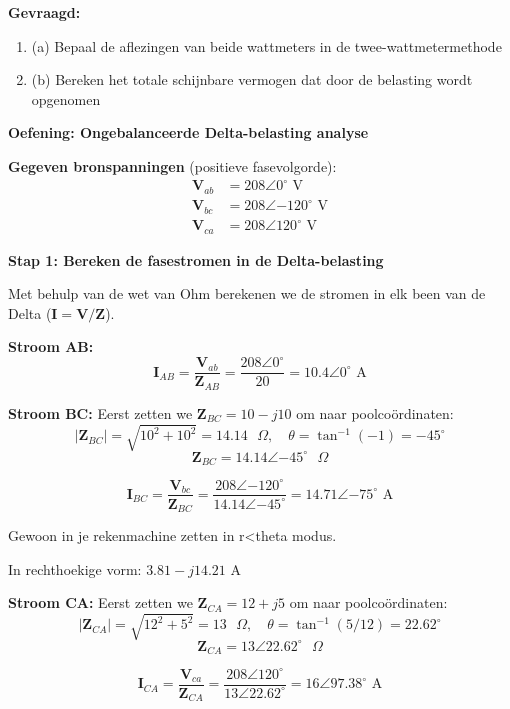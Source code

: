 \documentclass[a4paper,11pt]{article}
\begin{document}
\textbf{Gevraagd:}
\begin{enumerate}
    \item (a) Bepaal de aflezingen van beide wattmeters in de twee-wattmetermethode
    \item (b) Bereken het totale schijnbare vermogen dat door de belasting wordt opgenomen
\end{enumerate}

\begin{oefenblok}

\textbf{Oefening: Ongebalanceerde Delta-belasting analyse}

\textbf{Gegeven bronspanningen} (positieve fasevolgorde):
\begin{align*}
\mathbf{V}_{ab} &= 208\angle{0^\circ} \text{ V} \\
\mathbf{V}_{bc} &= 208\angle{-120^\circ} \text{ V} \\
\mathbf{V}_{ca} &= 208\angle{120^\circ} \text{ V}
\end{align*}

\textbf{Stap 1: Bereken de fasestromen in de Delta-belasting}

Met behulp van de wet van Ohm berekenen we de stromen in elk been van de Delta ($\mathbf{I} = \mathbf{V}/\mathbf{Z}$).

\textbf{Stroom AB:}
$$\mathbf{I}_{AB} = \frac{\mathbf{V}_{ab}}{\mathbf{Z}_{AB}} = \frac{208\angle{0^\circ}}{20} = 10.4\angle{0^\circ} \text{ A}$$

\textbf{Stroom BC:}
Eerst zetten we $\mathbf{Z}_{BC} = 10 - j10$ om naar poolcoördinaten:
$$|\mathbf{Z}_{BC}| = \sqrt{10^2 + 10^2} = 14.14 \text{ } \Omega, \quad \theta = \tan^{-1}(-1) = -45^\circ$$
$$\mathbf{Z}_{BC} = 14.14\angle{-45^\circ} \text{ } \Omega$$

$$\mathbf{I}_{BC} = \frac{\mathbf{V}_{bc}}{\mathbf{Z}_{BC}} = \frac{208\angle{-120^\circ}}{14.14\angle{-45^\circ}} = 14.71\angle{-75^\circ} \text{ A}$$

Gewoon in je rekenmachine zetten in r<theta modus.

In rechthoekige vorm: $3.81 - j14.21 \text{ A}$

\textbf{Stroom CA:}
Eerst zetten we $\mathbf{Z}_{CA} = 12 + j5$ om naar poolcoördinaten:
$$|\mathbf{Z}_{CA}| = \sqrt{12^2 + 5^2} = 13 \text{ } \Omega, \quad \theta = \tan^{-1}(5/12) = 22.62^\circ$$
$$\mathbf{Z}_{CA} = 13\angle{22.62^\circ} \text{ } \Omega$$

$$\mathbf{I}_{CA} = \frac{\mathbf{V}_{ca}}{\mathbf{Z}_{CA}} = \frac{208\angle{120^\circ}}{13\angle{22.62^\circ}} = 16\angle{97.38^\circ} \text{ A}$$


\end{oefenblok}
\end{document}
